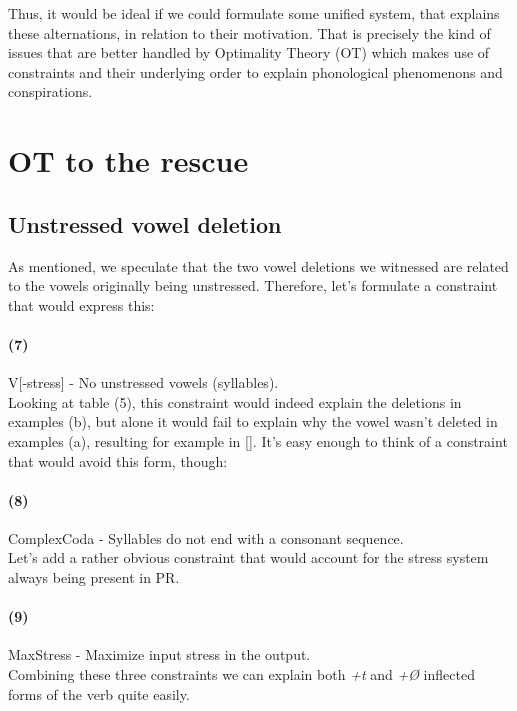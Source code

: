 \documentclass[11pt,draft]{article}
\begin{document}
Thus, it would be ideal if we could formulate some unified system, that explains these alternations, in relation to their motivation.
That is precisely the kind of issues that are better handled by Optimality Theory (OT) which makes use of constraints and their underlying order to explain phonological phenomenons and conspirations. 

\section {OT to the rescue}

\subsection {Unstressed vowel deletion}

As mentioned, we speculate that the two vowel deletions we witnessed are related to the vowels originally being unstressed.
Therefore, let's formulate a constraint that would express this:

\paragraph*{(7)} {{\sc *V[-stress]} - No unstressed vowels (syllables).}
\\

Looking at table (5), this constraint would indeed explain the deletions in examples (b), but alone it would fail to explain why the vowel wasn't deleted in examples (a), resulting for example in [].
It's easy enough to think of a constraint that would avoid this form, though:

\paragraph*{(8)} {{\sc *ComplexCoda} - Syllables do not end with a consonant sequence.}
\\

Let's add a rather obvious constraint that would account for the stress system always being present in PR.

\paragraph* {(9)} {{\sc MaxStress} - Maximize input stress in the output.}
\\

Combining these three constraints we can explain both \textsl{+t} and \textsl{+\O} inflected forms of the verb quite easily.
\\
\end{document}
